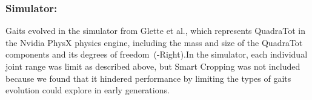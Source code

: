 
\subsubsection{Simulator:}
Gaits evolved in the simulator from Glette et al., which represents QuadraTot in the Nvidia PhysX physics engine, including the mass and size of the QuadraTot components and its degrees of freedom~(-Right).\footnotemark[\value{footnote}] In the simulator, each individual joint range was limit as described above, but Smart Cropping was not included because we found that it hindered performance by limiting the types of gaits evolution could explore in early generations. 


